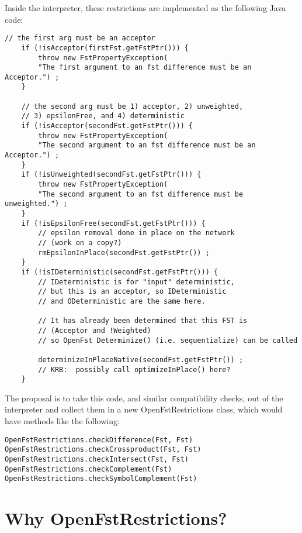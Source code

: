\documentclass[letterpaper,12pt]{article}
\begin{document}
\noindent
Inside the interpreter, these restrictions are implemented as the following Java
code:

\begin{Verbatim}[fontsize=\small]
    // the first arg must be an acceptor
    if (!isAcceptor(firstFst.getFstPtr())) {
        throw new FstPropertyException(
        "The first argument to an fst difference must be an Acceptor.") ;
    }

    // the second arg must be 1) acceptor, 2) unweighted, 
    // 3) epsilonFree, and 4) deterministic
    if (!isAcceptor(secondFst.getFstPtr())) {
        throw new FstPropertyException(
        "The second argument to an fst difference must be an Acceptor.") ;
    }
    if (!isUnweighted(secondFst.getFstPtr())) {
        throw new FstPropertyException(
        "The second argument to an fst difference must be unweighted.") ;
    }
    if (!isEpsilonFree(secondFst.getFstPtr())) {
        // epsilon removal done in place on the network
        // (work on a copy?)
        rmEpsilonInPlace(secondFst.getFstPtr()) ;
    }
    if (!isIDeterministic(secondFst.getFstPtr())) {
        // IDeterministic is for "input" deterministic,
        // but this is an acceptor, so IDeterministic
        // and ODeterministic are the same here.

        // It has already been determined that this FST is 
        // (Acceptor and !Weighted)
        // so OpenFst Determinize() (i.e. sequentialize) can be called

        determinizeInPlaceNative(secondFst.getFstPtr()) ;
        // KRB:  possibly call optimizeInPlace() here?
    } 
\end{Verbatim}

The proposal is to take this code, and similar compatibility checks, out of the
interpreter and collect them in a new OpenFstRestrictions class, which would have
methods like the following:

\begin{Verbatim}
OpenFstRestrictions.checkDifference(Fst, Fst) 
OpenFstRestrictions.checkCrossproduct(Fst, Fst)
OpenFstRestrictions.checkIntersect(Fst, Fst)
OpenFstRestrictions.checkComplement(Fst)
OpenFstRestrictions.checkSymbolComplement(Fst)
\end{Verbatim}

\section{Why OpenFstRestrictions?}
\end{document}
